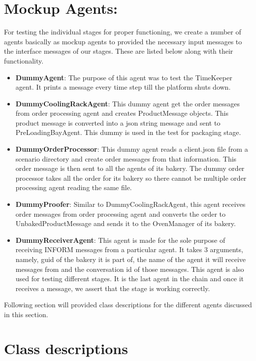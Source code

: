 \documentclass[12pt]{article}
\begin{document}
\section{Mockup Agents:}
For testing the individual stages for proper functioning, we create a number of agents basically as mockup agents to provided the necessary input messages to the interface messages of our stages. These are listed below along with their functionality.
\begin{itemize}
    \item \textbf{DummyAgent}:
        The purpose of this agent was to test the TimeKeeper agent. It prints a message every time step
        till the platform shuts down.
    \item \textbf{DummyCoolingRackAgent}:
        This dummy agent get the order messages from order processing agent and creates ProductMessage
        objects. This product message is converted into a json string message and sent to PreLoadingBayAgent.
        This dummy is used in the test for packaging stage.
    \item \textbf{DummyOrderProcessor}:
        This dummy agent reads a client.json file from a scenario directory and create order messages
        from that information. This order message is then sent to all the agents of its bakery. The 
        dummy order processor takes all the order for its bakery so there cannot be multiple order processing 
        agent reading the same file.
    \item \textbf{DummyProofer}:
        Similar to DummyCoolingRackAgent, this agent receives order messages from order processing 
        agent and converts the order to UnbakedProductMessage and sends it to the OvenManager of its 
        bakery.
    \item \textbf{DummyReceiverAgent}:
        This agent is made for the sole purpose of receiving INFORM messages from a particular agent.
        It takes 3 arguments, namely, guid of the bakery it is part of, the name of the agent it will
        receive messages from and the conversation id of those messages. This agent is also used for 
        testing different stages. It is the last agent in the chain and once it receives a message, 
        we assert that the stage is working correctly.
\end{itemize}

Following section will provided class descriptions for the different agents discussed in this section.

\newpage{}
\section{Class descriptions}%
\label{sec:agent_descriptions}
\end{document}
